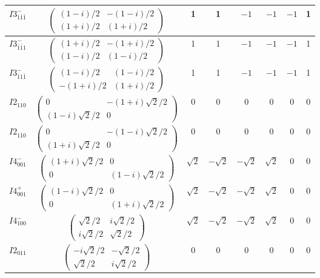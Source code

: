 \documentclass[3p,preprint]{elsarticle}
\begin{document}
\begin{table}[H]
\begin{tabular}{|c|c||c|c|c|c|c|c|}
			$I3^{-}_{1\bar{1}\bar{1}}$ &		$\left(\begin{array}{cc} (1-i)/2&-(1-i)/2 \\ (1+i)/2&(1+i)/2 \end{array}\right)$	&1 & 1 & $-1$ & $-1$ & $-1$ & 1 \\ \hline
			$I3^{-}_{\bar{1}\bar{1}1}$ &		$\left(\begin{array}{cc} (1+i)/2&-(1+i)/2 \\ (1-i)/2&(1-i)/2 \end{array}\right)$	&1 & 1 & $-1$ & $-1$ & $-1$ & 1 \\ \hline
			$I3^{-}_{\bar{1}1\bar{1}}$ &		$\left(\begin{array}{cc} (1-i)/2&(1-i)/2 \\ -(1+i)/2&(1+i)/2 \end{array}\right)$	&1 & 1 & $-1$ & $-1$ & $-1$ & 1 \\ \hline
			$I2_{110}$ &		$\left(\begin{array}{cc} 0&-(1+i)\sqrt{2}/2 \\ (1-i)\sqrt{2}/2&0 \end{array}\right)$	&$0$ & $0$ & $0$ & $0$ & $0$ & $0$ \\ \hline
			$I2_{1\bar{1}0}$ &		$\left(\begin{array}{cc} 0&-(1-i)\sqrt{2}/2 \\ (1+i)\sqrt{2}/2&0 \end{array}\right)$	&$0$ & $0$ & $0$ & $0$ & $0$ & $0$ \\ \hline
			$I4^{-}_{001}$ &		$\left(\begin{array}{cc} (1+i)\sqrt{2}/2&0 \\ 0&(1-i)\sqrt{2}/2 \end{array}\right)$	&$\sqrt{2}$ & $-\sqrt{2}$ & $-\sqrt{2}$ & $\sqrt{2}$ & $0$ & $0$ \\ \hline
			$I4^{+}_{001}$ &		$\left(\begin{array}{cc} (1-i)\sqrt{2}/2&0 \\ 0&(1+i)\sqrt{2}/2 \end{array}\right)$	&$\sqrt{2}$ & $-\sqrt{2}$ & $-\sqrt{2}$ & $\sqrt{2}$ & $0$ & $0$ \\ \hline
			$I4^{-}_{100}$ &		$\left(\begin{array}{cc} \sqrt{2}/2&i\sqrt{2}/2 \\ i\sqrt{2}/2&\sqrt{2}/2 \end{array}\right)$	&$\sqrt{2}$ & $-\sqrt{2}$ & $-\sqrt{2}$ & $\sqrt{2}$ & $0$ & $0$ \\ \hline
			$I2_{011}$ &		$\left(\begin{array}{cc} -i\sqrt{2}/2&-\sqrt{2}/2 \\ \sqrt{2}/2&i\sqrt{2}/2 \end{array}\right)$	&$0$ & $0$ & $0$ & $0$ & $0$ & $0$ \\ \hline

\end{tabular}
\end{table}
\end{document}
